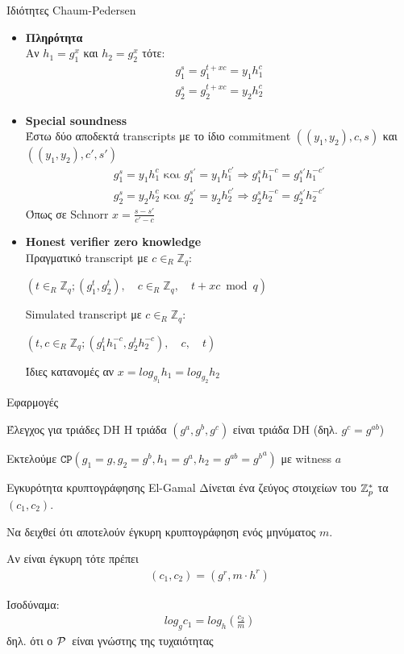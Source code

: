 \documentclass[10pt,handout]{beamer}
\begin{document}
\begin{frame}[allowframebreaks]{Ιδιότητες Chaum-Pedersen}
\begin{itemize}
\item \textbf{Πληρότητα}\\
Αν $h_1 = g_1^x$ και $h_2 = g_2^x$ τότε:
\begin{align*}
g_1^s = g_1^{t+xc} = y_1h_1^c \\
g_2^s = g_2^{t+xc} = y_2h_2^c
\end{align*}
\item \textbf{Special soundness}\\
Έστω δύο αποδεκτά transcripts με το ίδιο commitment $((y_1,y_2),c,s)$ και $((y_1,y_2),c',s')$
\begin{align*}
g_1^s =  y_1h_1^c \text{  και  } g_1^{s'} =  y_1h_1^{c'} \Rightarrow g_1^s h_1^{-c} = g_1^{s'} h_1^{-c'} \\
g_2^s =  y_2h_2^c \text{  και  } g_2^{s'} =  y_2h_2^{c'} \Rightarrow g_2^s h_2^{-c} = g_2^{s'} h_2^{-c'}
\end{align*}
Όπως σε Schnorr $x = \frac{s-s'}{c'-c}$
\framebreak
\item \textbf{Honest verifier zero knowledge}\\
Πραγματικό transcript με $c \in_R \mathbb{Z}_q$: 
\begin{center}
$(t \in_R \mathbb{Z}_q;(g_1^t,g_2^t), \quad c \in_R \mathbb{Z}_q,\quad t+xc \bmod{q})$
\end{center}
Simulated transcript με $c \in_R \mathbb{Z}_q$: 
\begin{center}
$(t,c \in_R \mathbb{Z}_q;(g_1^t h_1^{-c},g_2^th_2^{-c}), \quad c, \quad t)$
\end{center}
Ίδιες κατανομές αν $x=log_{g_1}{h_1}=log_{g_2}{h_2}$
\end{itemize}
\end{frame}

\begin{frame}{Εφαρμογές}
\begin{small}
\begin{block}{Έλεγχος για τριάδες DH}
Η τριάδα $(g^a,g^b,g^c)$ είναι τριάδα DH (δηλ. $g^c = g^{ab}$) 
\end{block}
\pause
Εκτελούμε $\mathtt{CP}(g_1 = g,g_2 = g^b,h_1 = g^a, h_2 = g^{ab} = {g^b}^a)$ με witness $a$
\begin{block}{Εγκυρότητα κρυπτογράφησης El-Gamal}
Δίνεται ένα ζεύγος στοιχείων του $\mathbb{Z}^*_{p}$ τα $(c_1,c_2)$. 

Να δειχθεί ότι αποτελούν έγκυρη κρυπτογράφηση ενός μηνύματος $m$.
\end{block}
\pause
Αν είναι έγκυρη τότε πρέπει
\begin{align*}
(c_1,c_2) = (g^r, m \cdot h^r)
\end{align*}

Ισοδύναμα: 
\begin{align*}
log_g c_1 = log_h (\frac{c_2}{m}) 
\end{align*}
δηλ. ότι ο $\mathcal{P}\,$ είναι γνώστης της τυχαιότητας
\end{small} 
\end{frame}
\end{document}

